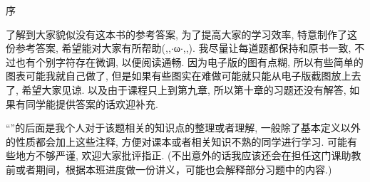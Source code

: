 \clearpage
\hideheaderfooter

\vspace*{-5mm} 
\begin{center}
    {\large\kaishu 序}
\end{center}

了解到大家貌似没有这本书的参考答案, 为了提高大家的学习效率, 特意制作了这份参考答案, 希望能对大家有所帮助(,,$\cdot$ω$\cdot$,,). 我尽量让每道题都保持和原书一致, 不过也有个别字符存在微调, 以便阅读通畅. 因为电子版的图有点糊, 所以有些简单的图表可能我就自己做了, 但是如果有些图实在难做可能就只能从电子版截图放上去了, 希望大家见谅. 以及由于课程只上到第九章, 所以第十章的习题还没有解答, 如果有同学能提供答案的话欢迎补充.


\hspace*{2em} \kaishu ``{\textcolor{themeColor}{\selectfont {}}}''的后面是我个人对于该题相关的知识点的整理或者理解, 一般除了基本定义以外的性质都会加上这些注释, 方便对课本或者相关知识不熟的同学进行学习. 可能有些地方不够严谨, 欢迎大家批评指正. (不出意外的话我应该还会在担任这门课助教前或者期间，根据本班进度做一份讲义，可能也会解释部分习题中的内容.)

\hspace*{2em} 
\clearpage